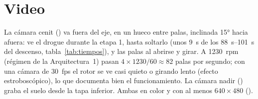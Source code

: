 \section{Video}
La cámara cenit () va fuera del eje, en un hueco entre palas, inclinada \ang{15}
hacia afuera: ve el drogue durante la etapa 1, hasta soltarlo (unos \SI{9}{s} de los
\SIrange{88}{101}{s} del descenso, tabla~\ref{tab:tiempos}), y las palas al abrirse y girar. A
\SI{1230}{rpm} (régimen de la Arquitectura~1) pasan $4\times1230/60\approx82$ palas por segundo; con una cámara de
\SI{30}{fps} el rotor se ve casi quieto o girando lento (efecto estroboscópico), lo que
documenta bien el funcionamiento. La cámara nadir () graba el suelo desde la tapa
inferior. Ambas en color y con al menos $640\times480$ ().
